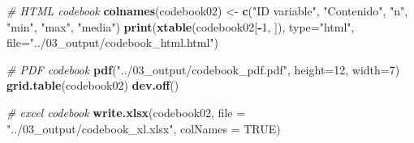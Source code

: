 \documentclass[
]{book}
\newenvironment{Shaded}{\begin{snugshade}}{\end{snugshade}}
\newcommand{\AttributeTok}[1]{\textcolor[rgb]{0.13,0.29,0.53}{#1}}
\newcommand{\CommentTok}[1]{\textcolor[rgb]{0.56,0.35,0.01}{\textit{#1}}}
\newcommand{\ConstantTok}[1]{\textcolor[rgb]{0.56,0.35,0.01}{#1}}
\newcommand{\DecValTok}[1]{\textcolor[rgb]{0.00,0.00,0.81}{#1}}
\newcommand{\FunctionTok}[1]{\textcolor[rgb]{0.13,0.29,0.53}{\textbf{#1}}}
\newcommand{\NormalTok}[1]{#1}
\newcommand{\OtherTok}[1]{\textcolor[rgb]{0.56,0.35,0.01}{#1}}
\newcommand{\SpecialCharTok}[1]{\textcolor[rgb]{0.81,0.36,0.00}{\textbf{#1}}}
\newcommand{\StringTok}[1]{\textcolor[rgb]{0.31,0.60,0.02}{#1}}
\begin{document}
\begin{Shaded}
\end{Shaded}

\begin{Shaded}
\begin{Highlighting}[]
\CommentTok{\# HTML codebook}
\FunctionTok{colnames}\NormalTok{(codebook02) }\OtherTok{\textless{}{-}} \FunctionTok{c}\NormalTok{(}\StringTok{"ID variable"}\NormalTok{, }\StringTok{"Contenido"}\NormalTok{, }\StringTok{"n"}\NormalTok{, }\StringTok{"min"}\NormalTok{, }\StringTok{"max"}\NormalTok{, }\StringTok{"media"}\NormalTok{)}
\FunctionTok{print}\NormalTok{(}\FunctionTok{xtable}\NormalTok{(codebook02[}\SpecialCharTok{{-}}\DecValTok{1}\NormalTok{, ]), }\AttributeTok{type=}\StringTok{"html"}\NormalTok{, }\AttributeTok{file=}\StringTok{"../03\_output/codebook\_html.html"}\NormalTok{)}

\CommentTok{\# PDF codebook}
\FunctionTok{pdf}\NormalTok{(}\StringTok{"../03\_output/codebook\_pdf.pdf"}\NormalTok{, }\AttributeTok{height=}\DecValTok{12}\NormalTok{, }\AttributeTok{width=}\DecValTok{7}\NormalTok{)}
\FunctionTok{grid.table}\NormalTok{(codebook02)}
\FunctionTok{dev.off}\NormalTok{()}

\CommentTok{\# excel codebook}
\FunctionTok{write.xlsx}\NormalTok{(codebook02, }\AttributeTok{file =} \StringTok{"../03\_output/codebook\_xl.xlsx"}\NormalTok{, }\AttributeTok{colNames =} \ConstantTok{TRUE}\NormalTok{)}
\end{Highlighting}
\end{Shaded}
\end{document}
